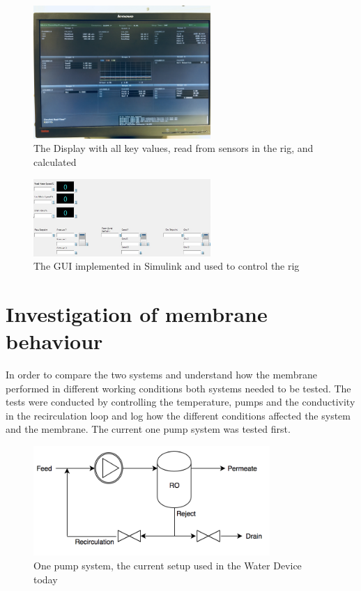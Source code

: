 \begin{figure}[H]
    \centering
    \includegraphics[width=0.6\textwidth]{Display}
    \caption{The Display with all key values, read from sensors in the rig, and calculated}
    \label{fig:display}
\end{figure}
\begin{figure}[H]
    \centering
    \includegraphics[width=0.6\textwidth]{GUI}
    \caption{The GUI implemented in Simulink and used to control the rig}
    \label{fig:gui}
\end{figure}


\newpage


\section{Investigation of membrane behaviour}

In order to compare the two systems and understand how the membrane performed in different working conditions both systems needed to be tested. The tests were conducted by controlling the temperature, pumps and the conductivity in the recirculation loop and log how the different conditions affected the system and the membrane. The current one pump system was tested first.
\begin{figure}[H]
  \centering
    \includegraphics[width=0.8\textwidth]{Sys1}
    \caption{One pump system, the current setup used in the Water Device today}
    \label{fig:System1}
\end{figure}

